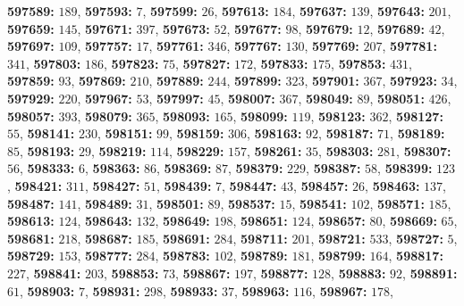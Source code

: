 \textsf{\bfseries 597589:} $189$, \textsf{\bfseries 597593:} $7$, \textsf{\bfseries 597599:} $26$, \textsf{\bfseries 597613:} $184$, \textsf{\bfseries 597637:} $139$, \textsf{\bfseries 597643:} $201$, \textsf{\bfseries 597659:} $145$, \textsf{\bfseries 597671:} $397$, \textsf{\bfseries 597673:} $52$, \textsf{\bfseries 597677:} $98$, \textsf{\bfseries 597679:} $12$, \textsf{\bfseries 597689:} $42$, \textsf{\bfseries 597697:} $109$, \textsf{\bfseries 597757:} $17$, \textsf{\bfseries 597761:} $346$, \textsf{\bfseries 597767:} $130$, \textsf{\bfseries 597769:} $207$, \textsf{\bfseries 597781:} $341$, \textsf{\bfseries 597803:} $186$, \textsf{\bfseries 597823:} $75$, \textsf{\bfseries 597827:} $172$, \textsf{\bfseries 597833:} $175$, \textsf{\bfseries 597853:} $431$, \textsf{\bfseries 597859:} $93$, \textsf{\bfseries 597869:} $210$, \textsf{\bfseries 597889:} $244$, \textsf{\bfseries 597899:} $323$, \textsf{\bfseries 597901:} $367$, \textsf{\bfseries 597923:} $34$, \textsf{\bfseries 597929:} $220$, \textsf{\bfseries 597967:} $53$, \textsf{\bfseries 597997:} $45$, \textsf{\bfseries 598007:} $367$, \textsf{\bfseries 598049:} $89$, \textsf{\bfseries 598051:} $426$, \textsf{\bfseries 598057:} $393$, \textsf{\bfseries 598079:} $365$, \textsf{\bfseries 598093:} $165$, \textsf{\bfseries 598099:} $119$, \textsf{\bfseries 598123:} $362$, \textsf{\bfseries 598127:} $55$, \textsf{\bfseries 598141:} $230$, \textsf{\bfseries 598151:} $99$, \textsf{\bfseries 598159:} $306$, \textsf{\bfseries 598163:} $92$, \textsf{\bfseries 598187:} $71$, \textsf{\bfseries 598189:} $85$, \textsf{\bfseries 598193:} $29$, \textsf{\bfseries 598219:} $114$, \textsf{\bfseries 598229:} $157$, \textsf{\bfseries 598261:} $35$, \textsf{\bfseries 598303:} $281$, \textsf{\bfseries 598307:} $56$, \textsf{\bfseries 598333:} $6$, \textsf{\bfseries 598363:} $86$, \textsf{\bfseries 598369:} $87$, \textsf{\bfseries 598379:} $229$, \textsf{\bfseries 598387:} $58$, \textsf{\bfseries 598399:} $123$, \textsf{\bfseries 598421:} $311$, \textsf{\bfseries 598427:} $51$, \textsf{\bfseries 598439:} $7$, \textsf{\bfseries 598447:} $43$, \textsf{\bfseries 598457:} $26$, \textsf{\bfseries 598463:} $137$, \textsf{\bfseries 598487:} $141$, \textsf{\bfseries 598489:} $31$, \textsf{\bfseries 598501:} $89$, \textsf{\bfseries 598537:} $15$, \textsf{\bfseries 598541:} $102$, \textsf{\bfseries 598571:} $185$, \textsf{\bfseries 598613:} $124$, \textsf{\bfseries 598643:} $132$, \textsf{\bfseries 598649:} $198$, \textsf{\bfseries 598651:} $124$, \textsf{\bfseries 598657:} $80$, \textsf{\bfseries 598669:} $65$, \textsf{\bfseries 598681:} $218$, \textsf{\bfseries 598687:} $185$, \textsf{\bfseries 598691:} $284$, \textsf{\bfseries 598711:} $201$, \textsf{\bfseries 598721:} $533$, \textsf{\bfseries 598727:} $5$, \textsf{\bfseries 598729:} $153$, \textsf{\bfseries 598777:} $284$, \textsf{\bfseries 598783:} $102$, \textsf{\bfseries 598789:} $181$, \textsf{\bfseries 598799:} $164$, \textsf{\bfseries 598817:} $227$, \textsf{\bfseries 598841:} $203$, \textsf{\bfseries 598853:} $73$, \textsf{\bfseries 598867:} $197$, \textsf{\bfseries 598877:} $128$, \textsf{\bfseries 598883:} $92$, \textsf{\bfseries 598891:} $61$, \textsf{\bfseries 598903:} $7$, \textsf{\bfseries 598931:} $298$, \textsf{\bfseries 598933:} $37$, \textsf{\bfseries 598963:} $116$, \textsf{\bfseries 598967:} $178$, 

